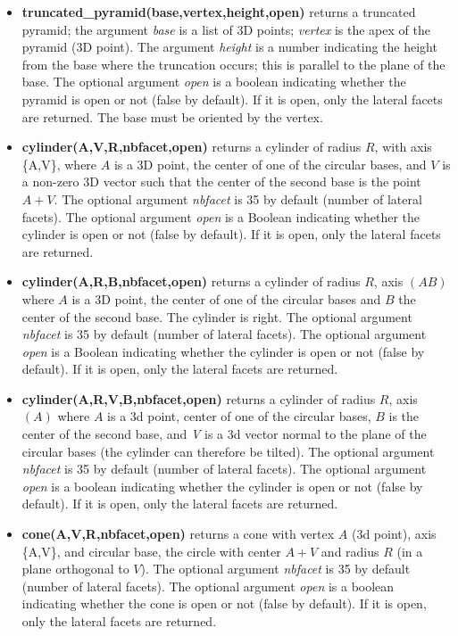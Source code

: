 \begin{itemize}
    \item \textbf{truncated\_pyramid(base,vertex,height,open)} returns a truncated pyramid; the argument \emph{base} is a list of 3D points; \emph{vertex} is the apex of the pyramid (3D point). The argument \emph{height} is a number indicating the height from the base where the truncation occurs; this is parallel to the plane of the base. The optional argument \emph{open} is a boolean indicating whether the pyramid is open or not (false by default). If it is open, only the lateral facets are returned. The base must be oriented by the vertex.

    \item \textbf{cylinder(A,V,R,nbfacet,open)} returns a cylinder of radius $R$, with axis \{A,V\}, where $A$ is a 3D point, the center of one of the circular bases, and $V$ is a non-zero 3D vector such that the center of the second base is the point $A+V$. The optional argument \emph{nbfacet} is 35 by default (number of lateral facets). The optional argument \emph{open} is a Boolean indicating whether the cylinder is open or not (false by default). If it is open, only the lateral facets are returned.

    \item \textbf{cylinder(A,R,B,nbfacet,open)} returns a cylinder of radius $R$, axis $(AB)$ where $A$ is a 3D point, the center of one of the circular bases and $B$ the center of the second base. The cylinder is right. The optional argument \emph{nbfacet} is 35 by default (number of lateral facets). The optional argument \emph{open} is a Boolean indicating whether the cylinder is open or not (false by default). If it is open, only the lateral facets are returned.

    \item \textbf{cylinder(A,R,V,B,nbfacet,open)} returns a cylinder of radius $R$, axis $(A)$ where $A$ is a 3d point, center of one of the circular bases, $B$ is the center of the second base, and \emph{V} is a 3d vector normal to the plane of the circular bases (the cylinder can therefore be tilted). The optional argument \emph{nbfacet} is 35 by default (number of lateral facets). The optional argument \emph{open} is a boolean indicating whether the cylinder is open or not (false by default). If it is open, only the lateral facets are returned.
    
    \item \textbf{cone(A,V,R,nbfacet,open)} returns a cone with vertex $A$ (3d point), axis \{A,V\}, and circular base, the circle with center $A+V$ and radius $R$ (in a plane orthogonal to $V$). The optional argument \emph{nbfacet} is 35 by default (number of lateral facets). The optional argument \emph{open} is a boolean indicating whether the cone is open or not (false by default). If it is open, only the lateral facets are returned.


\end{itemize}
